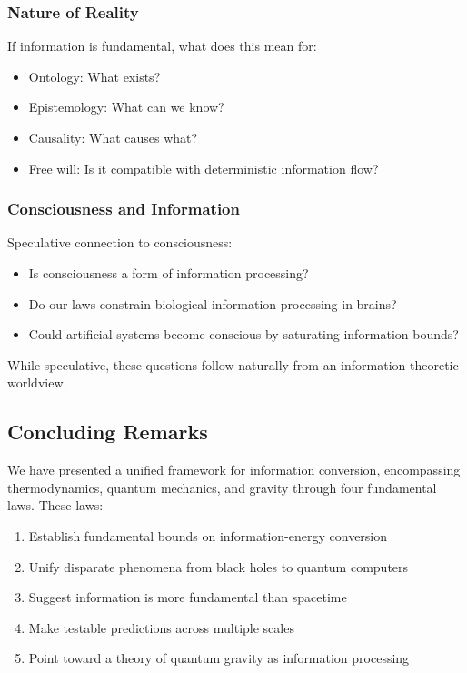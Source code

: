\documentclass[11pt,a4paper]{article}
\theoremstyle{plain}
\theoremstyle{definition}
\theoremstyle{remark}
\begin{document}
\subsubsection{Nature of Reality}

If information is fundamental, what does this mean for:

\begin{itemize}[leftmargin=*]
\item Ontology: What exists?
\item Epistemology: What can we know?
\item Causality: What causes what?
\item Free will: Is it compatible with deterministic information flow?
\end{itemize}

\subsubsection{Consciousness and Information}

Speculative connection to consciousness:

\begin{itemize}[leftmargin=*]
\item Is consciousness a form of information processing?
\item Do our laws constrain biological information processing in brains?
\item Could artificial systems become conscious by saturating information bounds?
\end{itemize}

While speculative, these questions follow naturally from an information-theoretic worldview.

\subsection{Concluding Remarks}

We have presented a unified framework for information conversion, encompassing thermodynamics, quantum mechanics, and gravity through four fundamental laws. These laws:

\begin{enumerate}[leftmargin=*]
\item Establish fundamental bounds on information-energy conversion
\item Unify disparate phenomena from black holes to quantum computers
\item Suggest information is more fundamental than spacetime
\item Make testable predictions across multiple scales
\item Point toward a theory of quantum gravity as information processing
\end{enumerate}
\end{document}
